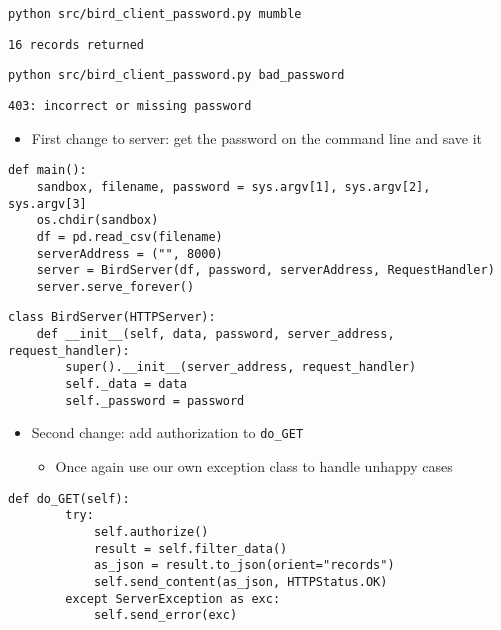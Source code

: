 \documentclass[krantzl]{krantz}
\begin{document}
\begin{lstlisting}[frame=tblr]
python src/bird_client_password.py mumble
\end{lstlisting}

\begin{lstlisting}[frame=tblr,backgroundcolor=\color{black!5}]
16 records returned
\end{lstlisting}

\begin{lstlisting}[frame=tblr]
python src/bird_client_password.py bad_password
\end{lstlisting}

\begin{lstlisting}[frame=tblr,backgroundcolor=\color{black!5}]
403: incorrect or missing password
\end{lstlisting}

\begin{itemize}
\item First change to server: get the password on the command line and save it

\end{itemize}
\begin{lstlisting}[frame=tblr]
def main():
    sandbox, filename, password = sys.argv[1], sys.argv[2], sys.argv[3]
    os.chdir(sandbox)
    df = pd.read_csv(filename)
    serverAddress = ("", 8000)
    server = BirdServer(df, password, serverAddress, RequestHandler)
    server.serve_forever()
\end{lstlisting}

\begin{lstlisting}[frame=tblr]
class BirdServer(HTTPServer):
    def __init__(self, data, password, server_address, request_handler):
        super().__init__(server_address, request_handler)
        self._data = data
        self._password = password
\end{lstlisting}

\begin{itemize}
\item Second change: add authorization to \texttt{do\_GET}\begin{itemize}
\item Once again use our own exception class to handle unhappy cases

\end{itemize}


\end{itemize}
\begin{lstlisting}[frame=tblr]
    def do_GET(self):
        try:
            self.authorize()
            result = self.filter_data()
            as_json = result.to_json(orient="records")
            self.send_content(as_json, HTTPStatus.OK)
        except ServerException as exc:
            self.send_error(exc)
\end{lstlisting}
\end{document}
